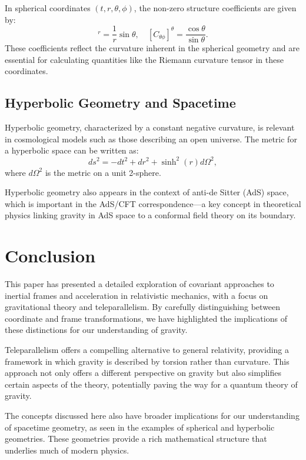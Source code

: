 \documentclass[12pt]{article}
\begin{document}
In spherical coordinates \( (t, r, \theta, \phi) \), the non-zero structure coefficients are given by:
\begin{equation}
[C_{\theta\phi}]^r = \frac{1}{r} \sin\theta, \quad [C_{\theta\phi}]^{\theta} = \frac{\cos\theta}{\sin\theta}.
\end{equation}
These coefficients reflect the curvature inherent in the spherical geometry and are essential for calculating quantities like the Riemann curvature tensor in these coordinates.

\subsection{Hyperbolic Geometry and Spacetime}
Hyperbolic geometry, characterized by a constant negative curvature, is relevant in cosmological models such as those describing an open universe. The metric for a hyperbolic space can be written as:
\begin{equation}
ds^2 = -dt^2 + dr^2 + \sinh^2(r) d\Omega^2,
\end{equation}
where \( d\Omega^2 \) is the metric on a unit 2-sphere.

Hyperbolic geometry also appears in the context of anti-de Sitter (AdS) space, which is important in the AdS/CFT correspondence—a key concept in theoretical physics linking gravity in AdS space to a conformal field theory on its boundary.

\section{Conclusion}
This paper has presented a detailed exploration of covariant approaches to inertial frames and acceleration in relativistic mechanics, with a focus on gravitational theory and teleparallelism. By carefully distinguishing between coordinate and frame transformations, we have highlighted the implications of these distinctions for our understanding of gravity.

Teleparallelism offers a compelling alternative to general relativity, providing a framework in which gravity is described by torsion rather than curvature. This approach not only offers a different perspective on gravity but also simplifies certain aspects of the theory, potentially paving the way for a quantum theory of gravity.

The concepts discussed here also have broader implications for our understanding of spacetime geometry, as seen in the examples of spherical and hyperbolic geometries. These geometries provide a rich mathematical structure that underlies much of modern physics.
\end{document}
